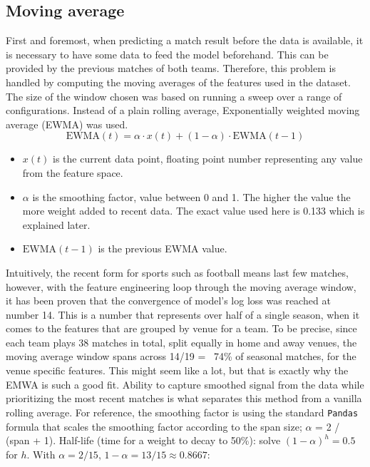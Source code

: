\documentclass{article}
\begin{document}
\subsection{Moving average}
First and foremost, when predicting a match result before the data is available, it is necessary to have some data to feed the model beforehand. This can be provided by the previous matches of both teams. Therefore, this problem is handled by computing the moving averages of the features used in the dataset. The size of the window chosen was based on running a sweep over a range of configurations. Instead of a plain rolling average, Exponentially weighted moving average (EWMA) was used. 
\begin{equation}
\text{EWMA}(t) = \alpha \cdot x(t) + (1 - \alpha) \cdot \text{EWMA}(t-1)
\end{equation}

\begin{itemize}
    \item $x(t)$ is the current data point, floating point number representing any value from the feature space.
    \item $\alpha$ is the smoothing factor, value between 0 and 1. The higher the value the more weight added to recent data. The exact value used here is 0.133 which is explained later.
    \item $\text{EWMA}(t-1)$ is the previous EWMA value.
\end{itemize}

Intuitively, the recent form for sports such as football means last few matches, however, with the feature engineering loop through the moving average window, it has been proven that the convergence of model's log loss was reached at number 14. This is a number that represents over half of a single season, when it comes to the features that are grouped by venue for a team. To be precise, since each team plays 38 matches in total, split equally in home and away venues, the moving average window spans across 14/19 = ~74\% of seasonal matches, for the venue specific features. This might seem like a lot, but that is exactly why the EMWA is such a good fit. Ability to capture smoothed signal from the data while prioritizing the most recent matches is what separates this method from a vanilla rolling average. For reference, the smoothing factor is using the standard \texttt{Pandas} formula that scales the smoothing factor according to the span size; $\alpha$ = 2 / (span + 1).
Half-life (time for a weight to decay to 50\%): solve $(1-\alpha)^h = 0.5$ for $h$.
With $\alpha = 2/15$, $1-\alpha = 13/15 \approx 0.8667$:
\end{document}
